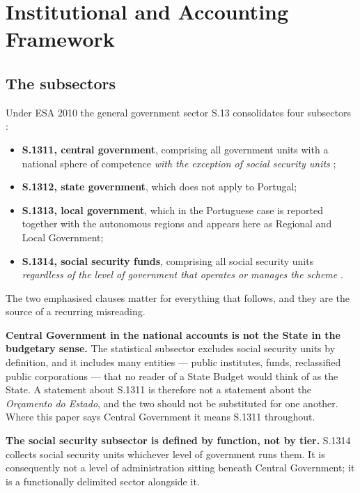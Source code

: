 
\section{Institutional and Accounting Framework}
\label{sec:framework}

\subsection{The subsectors}

Under ESA 2010 the general government sector S.13 consolidates four subsectors
\citep{eurostat_esa2010}:

\begin{itemize}
\item \textbf{S.1311, central government}, comprising all government units with a
national sphere of competence \emph{with the exception of social security units}
\citep{eurostat_central_glossary};
\item \textbf{S.1312, state government}, which does not apply to Portugal;
\item \textbf{S.1313, local government}, which in the Portuguese case is reported
together with the autonomous regions and appears here as Regional and Local
Government;
\item \textbf{S.1314, social security funds}, comprising all social security units
\emph{regardless of the level of government that operates or manages the scheme}
\citep{eurostat_ssf_glossary}.
\end{itemize}

The two emphasised clauses matter for everything that follows, and they are the
source of a recurring misreading.

\textbf{Central Government in the national accounts is not the State in the
budgetary sense.} The statistical subsector excludes social security units by
definition, and it includes many entities --- public institutes, funds,
reclassified public corporations --- that no reader of a State Budget would think of
as the State. A statement about S.1311 is therefore not a statement about the
\emph{Or\c{c}amento do Estado}, and the two should not be substituted for one
another. Where this paper says Central Government it means S.1311 throughout.

\textbf{The social security subsector is defined by function, not by tier.} S.1314
collects social security units whichever level of government runs them. It is
consequently not a level of administration sitting beneath Central Government; it
is a functionally delimited sector alongside it.

